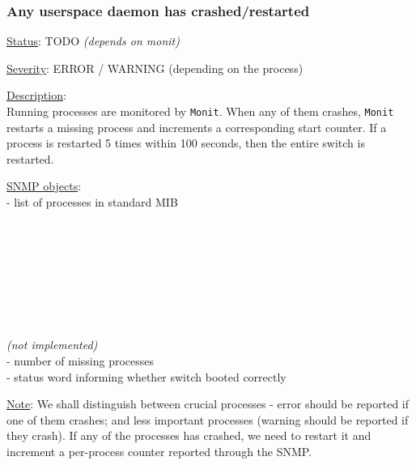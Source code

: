 \subsubsection{\bf Any userspace daemon has crashed/restarted}
		\label{fail:other:daemon_crash}
		\begin{packed_enum}
			\item [] \underline{Status}: TODO \emph{(depends on monit)}
			\item [] \underline{Severity}: ERROR / WARNING (depending on the process)
			\item [] \underline{Description}:\\
				Running processes are monitored by \texttt{Monit}. When any of them
				crashes, \texttt{Monit} restarts a missing process and increments a
				corresponding start counter. If a process is restarted 5 times within
				100 seconds, then the entire switch is restarted.
			\item [] \underline{SNMP objects}:\\
				 - list of processes in standard MIB\\
				\\
				\\
				\\
				\\
				\\
				\\
				\\
				\\
				 \emph{(not implemented)}\\
				 - number of missing processes\\
				 - status word informing whether switch booted correctly
			\item [] \underline{Note}: We shall distinguish between crucial
				processes - error should be reported if one of them crashes; and less
				important processes (warning should be reported if they crash). If any
				of the processes has crashed, we need to restart it and increment a
				per-process counter reported through the SNMP.


\end{packed_enum}
